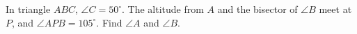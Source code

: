 In triangle $ABC$, $\angle C=50^\circ$. The altitude from $A$ and the bisector of $\angle B$ meet at $P$, and $\angle APB=105^\circ$. Find $\angle A$ and $\angle B$.

